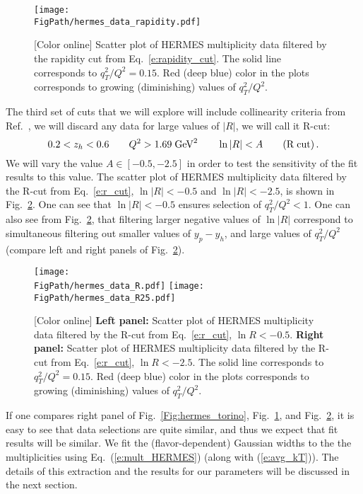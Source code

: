 \documentclass[final,3p,times,onecolumn,sort&compress,hidelinks]{elsarticle}
\newcommand*{\FigPath}{../Figs/}%
\begin{document}
\begin{figure}[htb!]
\centering
\texttt{[image: \\FigPath/hermes\_data\_rapidity.pdf]}
\caption{\label{Fig:hermes_new}
[Color online] Scatter plot of HERMES multiplicity data filtered by the rapidity cut from Eq.~\eqref{e:rapidity_cut}. The solid line corresponds to $q_T^2/Q^2=0.15$. Red (deep blue) color in the plots corresponds to growing (diminishing) values of $q_T^2/Q^2$.
}
\end{figure}

The third set of cuts that we will explore will include collinearity criteria from Ref.~\cite{Boglione:2016bph}, we will discard any data for large values of $|R|$, we will call it R-cut: 
 \begin{equation}
0.2 <  z_h < 0.6 \quad\quad Q^2 > 1.69 \; \textrm{GeV}^2  
\quad\quad   \ln |R|  < A \quad\quad{\rm (R\;cut)}\,.\label{e:r_cut}
\end{equation}
We will vary the value $A \in[-0.5, -2.5]$ in order to test the sensitivity of the fit results to this value. The scatter plot of HERMES multiplicity data filtered by the R-cut from Eq.~\eqref{e:r_cut},  $\ln |R|  < -0.5$ and $\ln |R| < -2.5$, is shown in Fig.~\ref{Fig:hermes_R}. One can see that $\ln |R|  < -0.5$ ensures selection of $q_T^2/Q^2<1$. One can also see from Fig.~\ref{Fig:hermes_R}, that filtering larger negative values of $\ln |R|$ correspond to simultaneous filtering out smaller values of $y_p - y_h$, and large values of $q_T^2/Q^2$ (compare left and right panels of Fig.~\ref{Fig:hermes_R}).
 
\begin{figure}[htb!]
\centering
\texttt{[image: \\FigPath/hermes\_data\_R.pdf]}
\texttt{[image: \\FigPath/hermes\_data\_R25.pdf]}
\caption{\label{Fig:hermes_R}
[Color online] {\bf Left panel:} Scatter plot of HERMES multiplicity data filtered by the R-cut from Eq.~\eqref{e:r_cut},  $\ln R  < -0.5$. {\bf Right panel:} Scatter plot of HERMES multiplicity data filtered by the R-cut from Eq.~\eqref{e:r_cut},  $\ln R  < -2.5$. The solid line corresponds to $q_T^2/Q^2=0.15$. Red (deep blue) color in the plots corresponds to growing (diminishing) values of $q_T^2/Q^2$.
}
\end{figure}
 

 
If one compares right panel of Fig.~\ref{Fig:hermes_torino},  Fig.~\ref{Fig:hermes_new}, and Fig.~\ref{Fig:hermes_R}, it is easy to see that data selections are quite similar, and thus we expect that fit results will be similar. We fit the (flavor-dependent) Gaussian widths to the the multiplicities using Eq.~(\ref{e:mult_HERMES}) (along with (\ref{e:avg_kT})).  The details of this extraction and the results for our parameters will be discussed in the next section.
\end{document}
